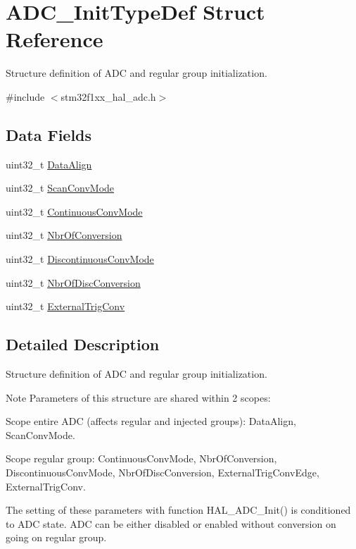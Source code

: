 \hypertarget{struct_a_d_c___init_type_def}{}\section{A\+D\+C\+\_\+\+Init\+Type\+Def Struct Reference}
\label{struct_a_d_c___init_type_def}


Structure definition of A\+DC and regular group initialization.  




{\ttfamily \#include $<$stm32f1xx\+\_\+hal\+\_\+adc.\+h$>$}

\subsection*{Data Fields}
\begin{DoxyCompactItemize}
\item 
uint32\+\_\+t \hyperlink{struct_a_d_c___init_type_def_afe646b2571044212378bf5f722544359}{Data\+Align}
\item 
uint32\+\_\+t \hyperlink{struct_a_d_c___init_type_def_a67902b5cdd3d1aa4af49654409412a08}{Scan\+Conv\+Mode}
\item 
uint32\+\_\+t \hyperlink{struct_a_d_c___init_type_def_a768ec42e36553ad0acb7ad029462a59d}{Continuous\+Conv\+Mode}
\item 
uint32\+\_\+t \hyperlink{struct_a_d_c___init_type_def_acc137bdcf502c586925ad8e99628b03f}{Nbr\+Of\+Conversion}
\item 
uint32\+\_\+t \hyperlink{struct_a_d_c___init_type_def_a9029916649c9ed5db0a3d86c7a0841bb}{Discontinuous\+Conv\+Mode}
\item 
uint32\+\_\+t \hyperlink{struct_a_d_c___init_type_def_a32f3fefba15f525dfc9b9d2cd8a5f9df}{Nbr\+Of\+Disc\+Conversion}
\item 
uint32\+\_\+t \hyperlink{struct_a_d_c___init_type_def_a3f4a71424165638d6621d75a351cb5e0}{External\+Trig\+Conv}
\end{DoxyCompactItemize}


\subsection{Detailed Description}
Structure definition of A\+DC and regular group initialization. 

\begin{DoxyNote}{Note}
Parameters of this structure are shared within 2 scopes\+:
\begin{DoxyItemize}
\item Scope entire A\+DC (affects regular and injected groups)\+: Data\+Align, Scan\+Conv\+Mode.
\item Scope regular group\+: Continuous\+Conv\+Mode, Nbr\+Of\+Conversion, Discontinuous\+Conv\+Mode, Nbr\+Of\+Disc\+Conversion, External\+Trig\+Conv\+Edge, External\+Trig\+Conv. 
\end{DoxyItemize}

The setting of these parameters with function H\+A\+L\+\_\+\+A\+D\+C\+\_\+\+Init() is conditioned to A\+DC state. A\+DC can be either disabled or enabled without conversion on going on regular group. 
\end{DoxyNote}


